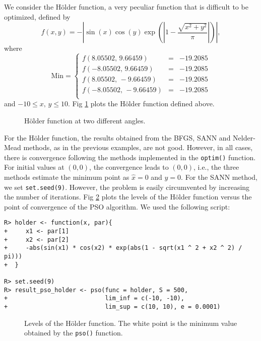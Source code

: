 \documentclass[10pt,letterpaper]{article}
\begin{document}
We consider the H\"{o}lder function, a very peculiar function that is difficult to be optimized, defined by
$$f(x,y) = - \left| \sin(x) \cos(y) \exp \left( \left| 1 - \frac{\sqrt{x^2 + y^2}}{\pi}  \right|  \right)   \right|,$$
where
$$
\mathrm{Min} = \left\{
\begin{array}{ccc}
f(8.05502,\, 9.66459) & = & -19.2085
\\
f(-8.05502,\, 9.66459) & = & -19.2085
\\
f(8.05502,\, -9.66459) & = & -19.2085
\\
f(-8.05502,\,-9.66459) & = & -19.2085
\\
\end{array}
\right.
$$
and $-10 \leq x,\, y \leq 10$.
Fig \ref{fig:holder}  plots the H\"{o}lder function defined above.

\begin{figure}[H]
	\centering
	\subfigure{
		\label{fig:holder2}
	}
	\subfigure{
		\label{fig:holder1}
	}
	\caption{H\"{o}lder function at two different angles.}
	\label{fig:holder}
\end{figure}

For the H\"{o}lder function, the results obtained from the BFGS, SANN and Nelder-Mead methods, as in the previous examples, are not good.
However, in all cases, there is convergence following the methods implemented in the \texttt{optim()} function.
For initial values at $(0, 0)$, the convergence leads to $(0, 0)$, i.e., the three methods estimate the minimum point as $\widehat{x} = 0$ and $\widehat{y} = 0$.
For the SANN method, we set \texttt{set.seed(9)}.
However, the problem is easily circumvented by increasing the number of iterations.
Fig \ref{curves_holder}  plots the levels of the H\"{o}lder function versus the point of convergence of the PSO algorithm.
We used the following script:
\begin{verbatim}
R> holder <- function(x, par){
+     x1 <- par[1]
+     x2 <- par[2]
+     -abs(sin(x1) * cos(x2) * exp(abs(1 - sqrt(x1 ^ 2 + x2 ^ 2) / pi)))
+  }

R> set.seed(9)
R> result_pso_holder <- pso(func = holder, S = 500,
+                           lim_inf = c(-10, -10),
+                           lim_sup = c(10, 10), e = 0.0001)
\end{verbatim}

\begin{figure}[H]
\centering
\caption{Levels of the H\"{o}lder function.
The white point is the minimum value obtained by the \texttt{pso()} function.}
\label{curves_holder}
\end{figure}
\end{document}
